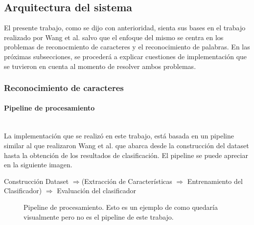 \subsection{Arquitectura del sistema}
\label{subsection:impl_propia}

	El presente trabajo, como se dijo con anterioridad, sienta sus bases en el trabajo realizado por Wang et al. salvo que el enfoque del mismo se centra en los problemas de reconocmiento de caracteres y el reconocimiento de palabras. En las próximas subsecciones, se procederá a explicar cuestiones de implementación que se tuvieron en cuenta al momento de resolver ambos problemas.

	\subsubsection{Reconocimiento de caracteres}

		\paragraph{Pipeline de procesamiento} ~\\

			La implementación que se realizó en este trabajo, está basada en un pipeline similar al que realizaron Wang et al. que abarca desde la construcción del dataset hasta la obtención de los resultados de clasificación. El pipeline se puede apreciar en la siguiente imagen.

	Construcción Dataset $\Rightarrow$(Extracción de Características $\Rightarrow$  Entrenamiento del Clasificador) $\Rightarrow$  Evaluación del clasificador



			\begin{figure}[htbp]
				\centering
				\caption{Pipeline de procesamiento. Esto es un ejemplo de como quedaría visualmente pero no es el pipeline de este trabajo.}
				\label{fig: Pipeline de mi sistema}
			\end{figure}

